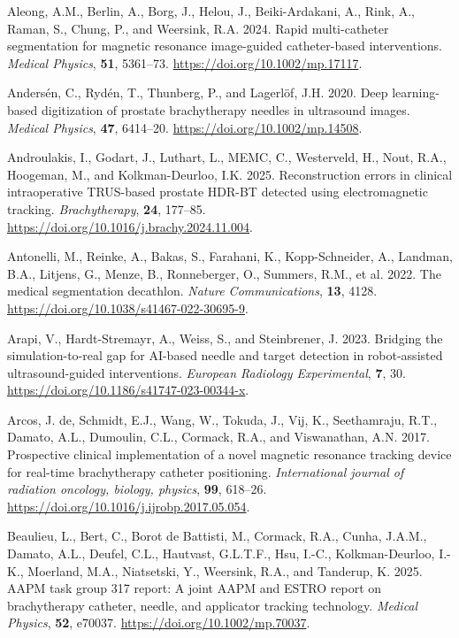 \documentclass[
  11pt,
]{article}
\newlength{\cslhangindent}
\newenvironment{CSLReferences}[2] %
 {\begin{list}{}{%
  \setlength{\itemindent}{0pt}
  \setlength{\leftmargin}{0pt}
  \setlength{\parsep}{0pt}
  \ifodd #1
   \setlength{\leftmargin}{\cslhangindent}
   \setlength{\itemindent}{-1\cslhangindent}
  \fi
  \setlength{\itemsep}{#2\baselineskip}}}
 {\end{list}}
\begin{document}
\label{refs}
\begin{CSLReferences}{1}{1}
Aleong, A.M., Berlin, A., Borg, J., Helou, J., Beiki-Ardakani, A., Rink,
A., Raman, S., Chung, P., and Weersink, R.A. 2024. Rapid multi-catheter
segmentation for magnetic resonance image-guided catheter-based
interventions. \emph{Medical Physics}, \textbf{51}, 5361--73.
\url{https://doi.org/10.1002/mp.17117}.

Andersén, C., Rydén, T., Thunberg, P., and Lagerlöf, J.H. 2020. Deep
learning-based digitization of prostate brachytherapy needles in
ultrasound images. \emph{Medical Physics}, \textbf{47}, 6414--20.
\url{https://doi.org/10.1002/mp.14508}.

Androulakis, I., Godart, J., Luthart, L., MEMC, C., Westerveld, H.,
Nout, R.A., Hoogeman, M., and Kolkman-Deurloo, I.K. 2025. Reconstruction
errors in clinical intraoperative TRUS-based prostate HDR-BT detected
using electromagnetic tracking. \emph{Brachytherapy}, \textbf{24},
177--85. \url{https://doi.org/10.1016/j.brachy.2024.11.004}.

Antonelli, M., Reinke, A., Bakas, S., Farahani, K., Kopp-Schneider, A.,
Landman, B.A., Litjens, G., Menze, B., Ronneberger, O., Summers, R.M.,
et al. 2022. The medical segmentation decathlon. \emph{Nature
Communications}, \textbf{13}, 4128.
\url{https://doi.org/10.1038/s41467-022-30695-9}.

Arapi, V., Hardt-Stremayr, A., Weiss, S., and Steinbrener, J. 2023.
Bridging the simulation-to-real gap for {AI}-based needle and target
detection in robot-assisted ultrasound-guided interventions.
\emph{European Radiology Experimental}, \textbf{7}, 30.
\url{https://doi.org/10.1186/s41747-023-00344-x}.

Arcos, J. de, Schmidt, E.J., Wang, W., Tokuda, J., Vij, K., Seethamraju,
R.T., Damato, A.L., Dumoulin, C.L., Cormack, R.A., and Viswanathan, A.N.
2017. Prospective clinical implementation of a novel magnetic resonance
tracking device for real-time brachytherapy catheter positioning.
\emph{International journal of radiation oncology, biology, physics},
\textbf{99}, 618--26.
\url{https://doi.org/10.1016/j.ijrobp.2017.05.054}.

Beaulieu, L., Bert, C., Borot de Battisti, M., Cormack, R.A., Cunha,
J.A.M., Damato, A.L., Deufel, C.L., Hautvast, G.L.T.F., Hsu, I.-C.,
Kolkman-Deurloo, I.-K., Moerland, M.A., Niatsetski, Y., Weersink, R.A.,
and Tanderup, K. 2025. {AAPM} task group 317 report: A joint {AAPM} and
{ESTRO} report on brachytherapy catheter, needle, and applicator
tracking technology. \emph{Medical Physics}, \textbf{52}, e70037.
\url{https://doi.org/10.1002/mp.70037}.


\end{CSLReferences}
\end{document}
